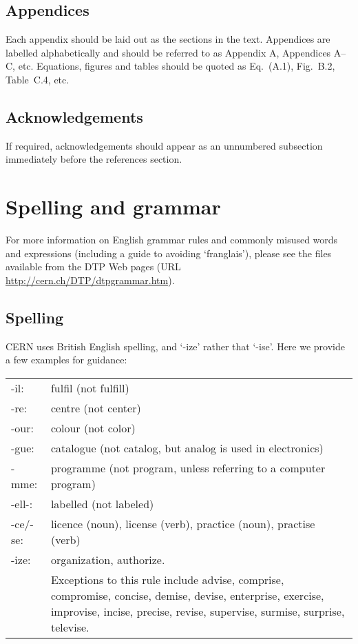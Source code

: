 \documentclass{cernphprep}
\makeatletter
\providecommand*\etc{etc.\@\xspace}
\makeatother
\begin{document}
\subsection{Appendices}

Each appendix should be laid out as the sections in the text.
Appendices are labelled alphabetically and should be referred to as
Appendix A, Appendices A--C, \etc Equations, figures and tables should
be quoted as Eq.~(A.1), Fig.~B.2, Table~C.4, \etc

\subsection{Acknowledgements}

If required, acknowledgements should appear as an unnumbered
subsection immediately before the references section.

\section{Spelling and grammar}

For more information on English grammar rules and commonly misused
words and expressions (including a guide to avoiding `franglais'),
please see the files available from the DTP Web pages (URL 
\url{http://cern.ch/DTP/dtpgrammar.htm}).

\subsection{Spelling}

CERN uses British English spelling, and `-ize' rather that
`-ise'. Here we provide a few examples for guidance:
\begin{flushleft}
\begin{tabularx}{\linewidth}{@{}lX}
-il:     & fulfil (not fulfill) \\
-re:     & centre (not center) \\
-our:    & colour (not color) \\ 
-gue:    & catalogue (not catalog, but analog is used in electronics) \\ 
-mme:    & programme (not program, unless referring to a computer
           program) \\ 
-ell-:   & labelled (not labeled) \\ 
-ce/-se: & licence (noun), license (verb), practice (noun), practise (verb) \\ 
-ize:    & organization, authorize. \\
         & Exceptions to this rule include advise, comprise, compromise, 
           concise, demise, devise, enterprise, exercise, improvise, 
           incise, precise, revise, supervise, surmise, surprise, televise.\\
\end{tabularx}
\end{flushleft}
\end{document}
